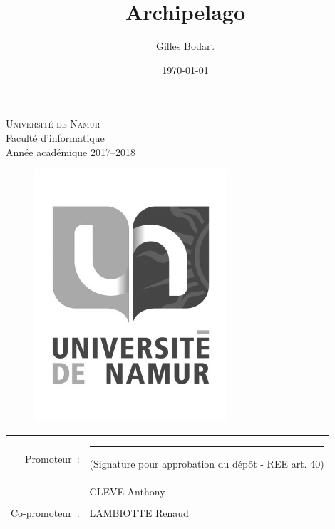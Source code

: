 \documentclass[a4paper,fleqn,12pt,oneside]{report}
\author{Gilles Bodart}
\date{\today}
\title{Archipelago}
\begin{document}
\thispagestyle{empty}

\begin{center}
\textsc{Universit\'e de Namur}\\
Facult\'e d'informatique\\
Ann\'ee acad\'emique 2017--2018
\end{center}
\vspace{1.3cm}
\hspace{1.4cm}
\begin{center}
\end{center}


\vspace{0.5cm}
\begin{figure}[!h]
\centering\includegraphics[width=.4\textwidth]{figures/unamur.pdf}
\end{figure}

\normalsize


\vspace{0.5cm}
\begin{table}[!h]
\centering
  \begin{tabular}{ r l }
    Promoteur~: &  \rule{4cm}{0.1mm} {\small (Signature pour approbation du d\'ep\^ot - REE art. 40)}\\
    ~\underline& CLEVE Anthony \\\\
    Co-promoteur~: & LAMBIOTTE Renaud  \\
  \end{tabular}
\end{table}
\end{document}
